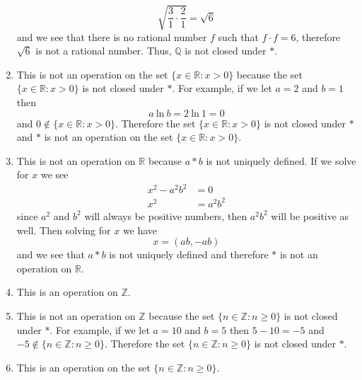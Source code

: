 \documentclass[12pt]{article}
\begin{document}
\begin{flushleft}
\begin{enumerate}
\begin{equation*}
              \sqrt{ \frac{3}{1} \cdot \frac{2}{1} } = \sqrt{6}
            \end{equation*}	
            and we see that there is no rational number $f$ such that $f \cdot f = 6$, therefore 
            $\sqrt{6}$ is not a rational number. Thus, $\mathbb{Q}$ is not closed under $*$.
          \item This is not an operation on the set $\{x \in \mathbb{R}: x > 0\}$ because the set 
            $\{x \in \mathbb{R}: x > 0\}$ is not closed under $*$. For example, if we let $a = 2$ and $b = 1$ then
            \begin{equation*}
              a~\text{ln}~b = 2~\text{ln}~1 = 0
            \end{equation*}
            and $ 0 \notin \{x \in \mathbb{R}: x > 0\}$. Therefore the set $\{x \in \mathbb{R}: x > 0\}$ 
            is not closed under $*$ and $*$ is not an operation on the set $\{x \in \mathbb{R}: x > 0\}$.
          \item This is not an operation on $\mathbb{R}$ because $a * b$ is not uniquely defined. If we solve for $x$ we see
            \begin{align*}
              x^{2} - a^{2}b^{2} &= 0 \\
              x^{2} &= a^{2}b^{2}
            \end{align*}
            since $a^{2}$ and $b^{2}$ will always be positive numbers, then $a^{2}b^{2}$ will be positive as well. 
            Then solving for $x$ we have
            \begin{equation*}
              x = \left( ab, - ab \right)
            \end{equation*}
            and we see that $a * b$ is not uniquely defined and therefore $*$ is not an operation on $\mathbb{R}$.
          \item This is an operation on $\mathbb{Z}$.
          \item This is not an operation on $\mathbb{Z}$ because the set $\{ n \in \mathbb{Z}:n \geq 0 \}$ is not 
            closed under $*$. For example, if we let $a = 10$ and $b = 5$ then $5-10=-5$ and 
            $-5 \notin \{ n \in \mathbb{Z}:n \geq 0 \}$. Therefore the set $\{ n \in \mathbb{Z}:n \geq 0 \}$ is not 
            closed under $*$.
          \item This is an operation on the set $\{ n \in \mathbb{Z}: n \geq 0 \}$.
        \end{enumerate}

\end{flushleft}
\end{document}
